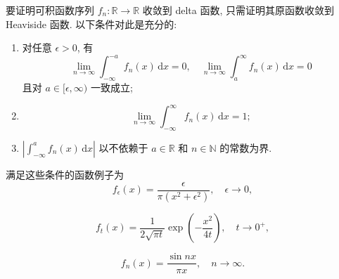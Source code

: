 \begin{Example}
\label{ex:delta-sequence-primitive}
要证明可积函数序列 $f_n:\mathbb{R}\to\mathbb{R}$ 收敛到 delta 函数, 只需证明其原函数收敛到 Heaviside 函数. 以下条件对此是充分的:
\begin{enumerate}\item 对任意 $\epsilon>0$, 有
\begin{equation}\label{eq:delta-sequence-uniform-tail-integrals}
\lim_{n\to\infty}\int_{-\infty}^{-a}f_n(x)\,\mathrm{d}x=0,\quad\lim_{n\to\infty}\int_a^\infty f_n(x)\,\mathrm{d}x=0
\end{equation}
且对 $a\in[\epsilon,\infty)$ 一致成立;
\item 
\begin{equation}\label{eq:delta-sequence-unit-integral-limit}
\lim_{n\to\infty}\int_{-\infty}^\infty f_n(x)\,\mathrm{d}x=1;
\end{equation}

\item $\left|\int_{-\infty}^af_n(x)\,\mathrm{d}x\right|$ 以不依赖于 $a\in\mathbb{R}$ 和 $n\in\mathbb{N}$ 的常数为界.
\end{enumerate}
满足这些条件的函数例子为
\begin{equation}\label{eq:cauchy-kernel-delta-sequence}
f_\epsilon(x)=\dfrac{\epsilon}{\pi(x^2+\epsilon^2)},\quad\epsilon\to0,
\end{equation}

\begin{equation}\label{eq:heat-kernel-delta-sequence}
f_t(x)=\dfrac1{2\sqrt{\pi t}}\exp\left(-\dfrac{x^2}{4t}\right),\quad t\to0^+,
\end{equation}

\begin{equation}\label{eq:sinc-kernel-delta-sequence}
f_n(x)=\dfrac{\sin nx}{\pi x},\quad n\to\infty.
\end{equation}

\end{Example}
